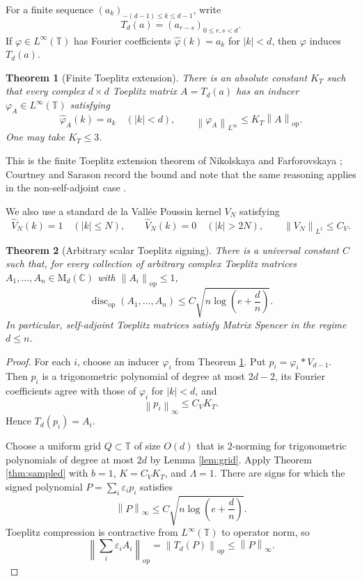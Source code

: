 \documentclass[11pt]{amsart}
\numberwithin{equation}{section}
\newtheorem{theorem}{Theorem}[section]
\theoremstyle{definition}
\theoremstyle{remark}
\newcommand{\C}{\mathbb C}
\newcommand{\T}{\mathbb T}
\newcommand{\M}{\mathrm M}
\newcommand{\op}{\mathrm{op}}
\newcommand{\discop}{\operatorname{disc}_{\op}}
\newcommand{\norm}[1]{\left\lVert #1\right\rVert}
\newcommand{\eps}{\varepsilon}
\begin{document}
For a finite sequence $(a_k)_{-(d-1)\le k\le d-1}$, write
\[
T_d(a)= (a_{r-s})_{0\le r,s<d} .
\]
If $\varphi\in L^\infty(\T)$ has Fourier coefficients
$\widehat\varphi(k)=a_k$ for $|k|<d$, then $\varphi$ induces $T_d(a)$.

\begin{theorem}[Finite Toeplitz extension]\label{thm:text}
There is an absolute constant $K_T$ such that every complex $d\times d$ Toeplitz
matrix $A=T_d(a)$ has an inducer $\varphi_A\in L^\infty(\T)$ satisfying
\[
\widehat\varphi_A(k)=a_k \quad (|k|<d),
\qquad
\norm{\varphi_A}_{L^\infty}\le K_T\norm{A}_{\op} .
\]
One may take $K_T\le 3$.
\end{theorem}

This is the finite Toeplitz extension theorem of Nikolskaya and Farforovskaya
\cite{NikolskayaFarforovskaya}; Courtney and Sarason record the bound and note
that the same reasoning applies in the non-self-adjoint case \cite{CourtneySarason}.

We also use a standard de la Vall\'ee Poussin kernel $V_N$ satisfying
\[
\widehat V_N(k)=1\quad(|k|\le N),
\qquad
\widehat V_N(k)=0\quad(|k|>2N),
\qquad
\norm{V_N}_{L^1}\le C_V .
\]

\begin{theorem}[Arbitrary scalar Toeplitz signing]\label{thm:toep}
There is a universal constant $C$ such that, for every collection of arbitrary
complex Toeplitz matrices $A_1,\ldots,A_n\in\M_d(\C)$ with
$\norm{A_i}_{\op}\le 1$,
\[
\discop(A_1,\ldots,A_n)
\le C\sqrt{n\log\left(e+\frac{d}{n}\right)} .
\]
In particular, self-adjoint Toeplitz matrices satisfy Matrix Spencer in the
regime $d\le n$.
\end{theorem}

\begin{proof}
For each $i$, choose an inducer $\varphi_i$ from Theorem
\ref{thm:text}. Put
$p_i=\varphi_i*V_{d-1}$. Then $p_i$ is a trigonometric polynomial of degree at
most $2d-2$, its Fourier coefficients agree with those of $\varphi_i$ for
$|k|<d$, and
\[
\norm{p_i}_{\infty}\le C_VK_T .
\]
Hence $T_d(p_i)=A_i$.

Choose a uniform grid $Q\subset\T$ of size $O(d)$ that is $2$-norming for
trigonometric polynomials of degree at most $2d$ by Lemma \ref{lem:grid}.
Apply Theorem \ref{thm:sampled} with $b=1$, $K=C_VK_T$, and $\Lambda=1$. There
are signs for which the signed polynomial $P=\sum_i\eps_i p_i$ satisfies
\[
\norm{P}_{\infty}
\le C\sqrt{n\log\left(e+\frac{d}{n}\right)} .
\]
Toeplitz compression is contractive from $L^\infty(\T)$ to operator norm, so
\[
\norm{\sum_i\eps_i A_i}_{\op}
= \norm{T_d(P)}_{\op}
\le \norm{P}_{\infty} .
\]
\end{proof}
\end{document}
